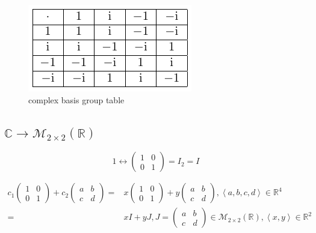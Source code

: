 \documentclass[
]{book}
\theoremstyle{definition}
\theoremstyle{definition}
\theoremstyle{definition}
\theoremstyle{definition}
\theoremstyle{remark}
\begin{document}
\begin{figure}
\centering
\includegraphics{202403281312-group-theory_files/figure-latex/unnamed-chunk-3-1.pdf}
\caption{\label{fig:unnamed-chunk-3}complex basis group table}
\end{figure}

\subsection{\texorpdfstring{\(\mathbb{C}\rightarrow\mathcal{M}_{2\times2}\left(\mathbb{R}\right)\)}{\textbackslash mathbb\{C\}\textbackslash rightarrow\textbackslash mathcal\{M\}\_\{2\textbackslash times2\}\textbackslash left(\textbackslash mathbb\{R\}\textbackslash right)}}\label{mathbbcrightarrowmathcalm_2times2leftmathbbrright}

\[
1\leftrightarrow\begin{pmatrix}1 & 0\\
0 & 1
\end{pmatrix}=I_{2}=I
\]

\[
\begin{aligned}
c_{{\scriptscriptstyle 1}}\begin{pmatrix}1 & 0\\
0 & 1
\end{pmatrix}+c_{{\scriptscriptstyle 2}}\begin{pmatrix}a & b\\
c & d
\end{pmatrix}= & x\begin{pmatrix}1 & 0\\
0 & 1
\end{pmatrix}+y\begin{pmatrix}a & b\\
c & d
\end{pmatrix},\left\langle a,b,c,d\right\rangle \in\mathbb{R}^{4}\\
= & xI+yJ,J=\begin{pmatrix}a & b\\
c & d
\end{pmatrix}\in\mathcal{M}_{2\times2}\left(\mathbb{R}\right),\left\langle x,y\right\rangle \in\mathbb{R}^{2}
\end{aligned}
\]
\end{document}
